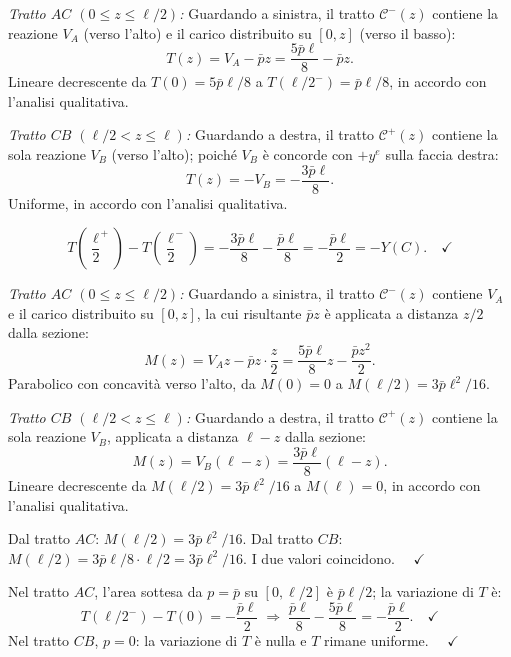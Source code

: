 \begin{esempio}
\begin{svolgimento}
		
		\textit{Tratto $AC$ $(0 \leq z \leq \ell/2)$:}
		Guardando a sinistra, il tratto $\mathcal{C}^-(z)$
		contiene la reazione $V_A$ (verso l'alto) e il
		carico distribuito su $[0,z]$ (verso il basso):
		\[
		T(z) = V_A - \bar{p}z
		= \frac{5\bar{p}\ell}{8} - \bar{p}z.
		\]
		Lineare decrescente da $T(0) = 5\bar{p}\ell/8$
		a $T(\ell/2^-) = \bar{p}\ell/8$, in accordo con
		l'analisi qualitativa.
		
		\textit{Tratto $CB$ $(\ell/2 < z \leq \ell)$:}
		Guardando a destra, il tratto $\mathcal{C}^+(z)$
		contiene la sola reazione $V_B$ (verso l'alto);
		poiché $V_B$ è concorde con $+y^e$ sulla faccia
		destra:
		\[
		T(z) = -V_B = -\frac{3\bar{p}\ell}{8}.
		\]
		Uniforme, in accordo con l'analisi qualitativa.
		
		\[
		T\!\left(\frac{\ell}{2}^+\right) -
		T\!\left(\frac{\ell}{2}^-\right)
		= -\frac{3\bar{p}\ell}{8} - \frac{\bar{p}\ell}{8}
		= -\frac{\bar{p}\ell}{2} = -Y(C). \quad\checkmark
		\]
		
		
		\textit{Tratto $AC$ $(0 \leq z \leq \ell/2)$:}
		Guardando a sinistra, il tratto $\mathcal{C}^-(z)$
		contiene $V_A$ e il carico distribuito su $[0,z]$,
		la cui risultante $\bar{p}z$ è applicata a distanza
		$z/2$ dalla sezione:
		\[
		M(z) = V_A z - \bar{p}z\cdot\frac{z}{2}
		= \frac{5\bar{p}\ell}{8}z - \frac{\bar{p}z^2}{2}.
		\]
		Parabolico con concavità verso l'alto, da
		$M(0) = 0$ a $M(\ell/2) = 3\bar{p}\ell^2/16$.
		
		\textit{Tratto $CB$ $(\ell/2 < z \leq \ell)$:}
		Guardando a destra, il tratto $\mathcal{C}^+(z)$
		contiene la sola reazione $V_B$, applicata a
		distanza $\ell - z$ dalla sezione:
		\[
		M(z) = V_B(\ell - z)
		= \frac{3\bar{p}\ell}{8}(\ell - z).
		\]
		Lineare decrescente da $M(\ell/2) = 3\bar{p}\ell^2/16$
		a $M(\ell) = 0$, in accordo con l'analisi qualitativa.
		
		Dal tratto $AC$: $M(\ell/2) = 3\bar{p}\ell^2/16$.
		Dal tratto $CB$: $M(\ell/2) = 3\bar{p}\ell/8 \cdot \ell/2
		= 3\bar{p}\ell^2/16$.
		I due valori coincidono. $\quad\checkmark$
		
		Nel tratto $AC$, l'area sottesa da $p = \bar{p}$
		su $[0,\ell/2]$ è $\bar{p}\ell/2$; la variazione
		di $T$ è:
		\[
		T(\ell/2^-) - T(0) = -\frac{\bar{p}\ell}{2}
		\;\Rightarrow\;
		\frac{\bar{p}\ell}{8} - \frac{5\bar{p}\ell}{8}
		= -\frac{\bar{p}\ell}{2}. \quad\checkmark
		\]
		Nel tratto $CB$, $p = 0$: la variazione di $T$
		è nulla e $T$ rimane uniforme. $\quad\checkmark$
		

\end{svolgimento}
\end{esempio}
